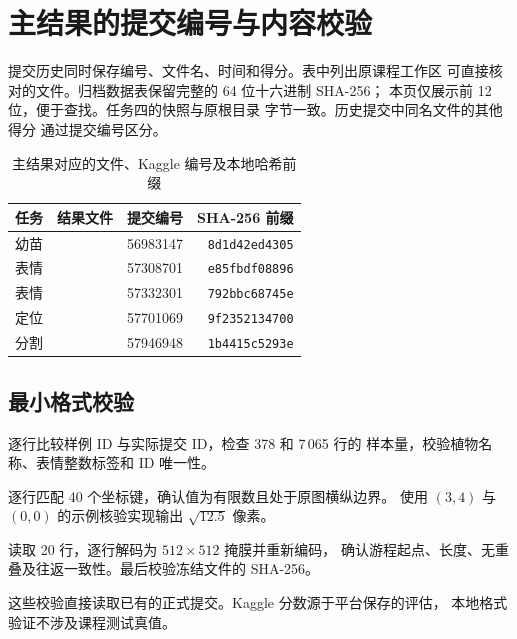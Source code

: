 \clearpage
\section{主结果的提交编号与内容校验}
提交历史同时保存编号、文件名、时间和得分。表中列出原课程工作区
可直接核对的文件。归档数据表保留完整的 64 位十六进制 SHA-256；
本页仅展示前 12 位，便于查找。任务四的快照与原根目录
 字节一致。历史提交中同名文件的其他得分
通过提交编号区分。

\begin{table}[H]
\centering\small
\caption{主结果对应的文件、Kaggle 编号及本地哈希前缀}
\begin{tabularx}{\linewidth}{@{}P{21mm}Yrr@{}}
\toprule
任务 & 结果文件 & 提交编号 & SHA-256 前缀 \\
\midrule
幼苗 &  & 56983147 & \texttt{8d1d42ed4305} \\
表情 &  & 57308701 & \texttt{e85fbdf08896} \\
表情 &  & 57332301 & \texttt{792bbc68745e} \\
定位 &  & 57701069 & \texttt{9f2352134700} \\
分割 &  & 57946948 & \texttt{1b4415c5293e} \\
\bottomrule
\end{tabularx}
\end{table}

\subsection{最小格式校验}
\begin{description}[style=nextline,leftmargin=4.5em]
\item[分类] 逐行比较样例 ID 与实际提交 ID，检查 378 和 7\,065 行的
样本量，校验植物名称、表情整数标签和 ID 唯一性。
\item[定位] 逐行匹配 40 个坐标键，确认值为有限数且处于原图横纵边界。
使用 $(3,4)$ 与 $(0,0)$ 的示例核验实现输出 $\sqrt{12.5}$ 像素。
\item[分割] 读取 20 行，逐行解码为 $512\times512$ 掩膜并重新编码，
确认游程起点、长度、无重叠及往返一致性。最后校验冻结文件的 SHA-256。
\end{description}

这些校验直接读取已有的正式提交。Kaggle 分数源于平台保存的评估，
本地格式验证不涉及课程测试真值。
